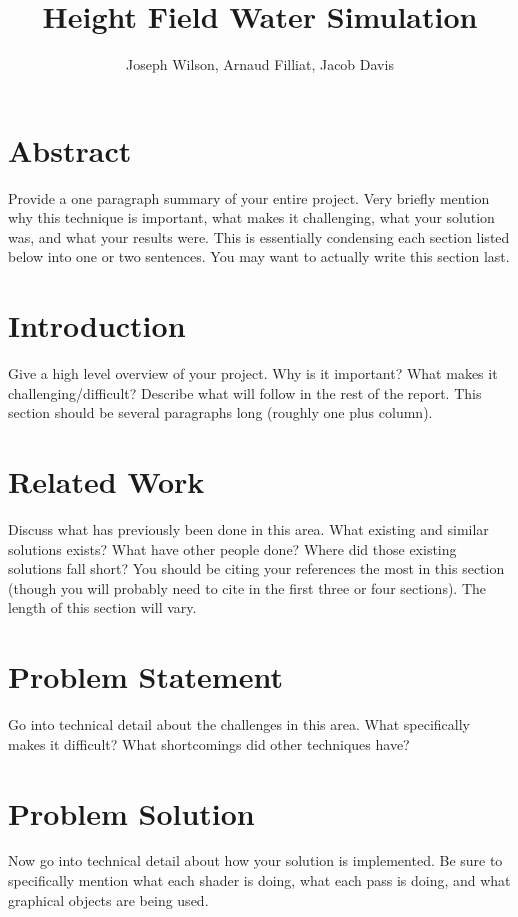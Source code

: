\documentclass[12pt,titlepage]{article}
\title{Height Field Water Simulation}
\author{Joseph Wilson, Arnaud Filliat, Jacob Davis}
\begin{document}
\maketitle

\section{Abstract}

Provide a one paragraph summary of your entire project. Very briefly mention why this technique is important, what makes it challenging, what your solution was, and what your results were. This is essentially condensing each section listed below into one or two sentences. You may want to actually write this section last.

\section{Introduction}

Give a high level overview of your project. Why is it important? What makes it challenging/difficult? Describe what will follow in the rest of the report. This section should be several paragraphs long (roughly one plus column).

\section{Related Work}

Discuss what has previously been done in this area. What existing and similar solutions exists? What have other people done? Where did those existing solutions fall short? You should be citing your references the most in this section (though you will probably need to cite in the first three or four sections). The length of this section will vary.

\section{Problem Statement}

Go into technical detail about the challenges in this area. What specifically makes it difficult? What shortcomings did other techniques have?

\section{Problem Solution}

Now go into technical detail about how your solution is implemented. Be sure to specifically mention what each shader is doing, what each pass is doing, and what graphical objects are being used.
\end{document}

